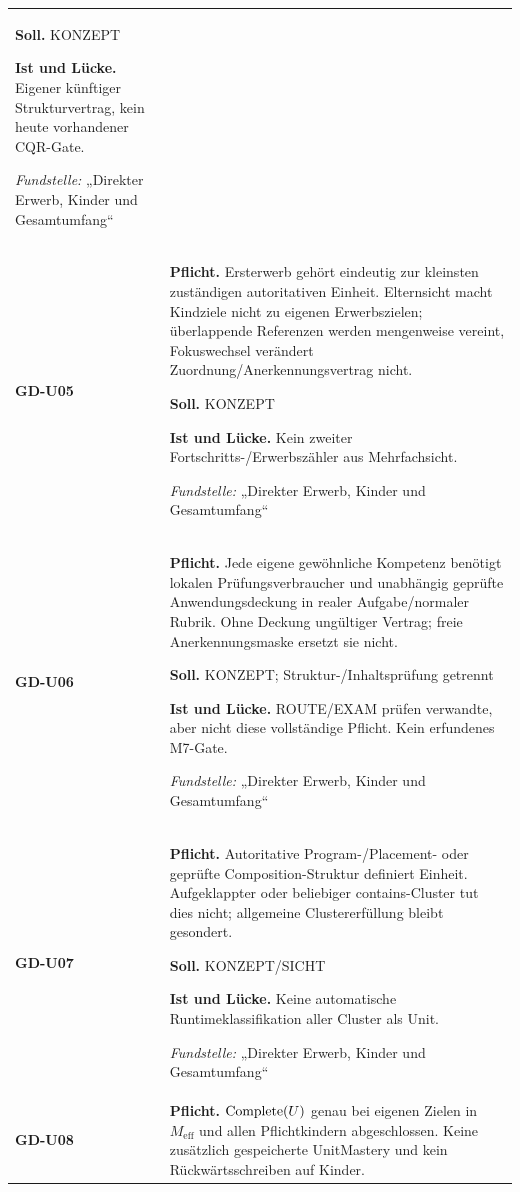 \begin{longtable}{@{}P{20mm}P{128mm}@{}}
\textbf{Soll.} KONZEPT\par\smallskip
\textbf{Ist und Lücke.} Eigener künftiger Strukturvertrag, kein heute vorhandener CQR-Gate.\par\smallskip
\emph{Fundstelle:} „Direkter Erwerb, Kinder und Gesamtumfang“\\\addlinespace[5pt]
\label{rule:GD-U05}\textbf{GD-U05} &
\textbf{Pflicht.} Ersterwerb gehört eindeutig zur kleinsten zuständigen autoritativen Einheit. Elternsicht macht Kindziele nicht zu eigenen Erwerbszielen; überlappende Referenzen werden mengenweise vereint, Fokuswechsel verändert Zuordnung/Anerkennungsvertrag nicht.\par\smallskip
\textbf{Soll.} KONZEPT\par\smallskip
\textbf{Ist und Lücke.} Kein zweiter Fortschritts-/Erwerbszähler aus Mehrfachsicht.\par\smallskip
\emph{Fundstelle:} „Direkter Erwerb, Kinder und Gesamtumfang“\\\addlinespace[5pt]
\label{rule:GD-U06}\textbf{GD-U06} &
\textbf{Pflicht.} Jede eigene gewöhnliche Kompetenz benötigt lokalen Prüfungsverbraucher und unabhängig geprüfte Anwendungsdeckung in realer Aufgabe/normaler Rubrik. Ohne Deckung ungültiger Vertrag; freie Anerkennungsmaske ersetzt sie nicht.\par\smallskip
\textbf{Soll.} KONZEPT; Struktur-/Inhaltsprüfung getrennt\par\smallskip
\textbf{Ist und Lücke.} ROUTE/EXAM prüfen verwandte, aber nicht diese vollständige Pflicht. Kein erfundenes M7-Gate.\par\smallskip
\emph{Fundstelle:} „Direkter Erwerb, Kinder und Gesamtumfang“\\\addlinespace[5pt]
\label{rule:GD-U07}\textbf{GD-U07} &
\textbf{Pflicht.} Autoritative Program-/Placement- oder geprüfte Composition-Struktur definiert Einheit. Aufgeklappter oder beliebiger contains-Cluster tut dies nicht; allgemeine Clustererfüllung bleibt gesondert.\par\smallskip
\textbf{Soll.} KONZEPT/SICHT\par\smallskip
\textbf{Ist und Lücke.} Keine automatische Runtimeklassifikation aller Cluster als Unit.\par\smallskip
\emph{Fundstelle:} „Direkter Erwerb, Kinder und Gesamtumfang“\\\addlinespace[5pt]
\label{rule:GD-U08}\textbf{GD-U08} &
\textbf{Pflicht.} \(\operatorname{Complete}(U)\) genau bei eigenen Zielen in \(M_{\mathrm{eff}}\) und allen Pflichtkindern abgeschlossen. Keine zusätzlich gespeicherte UnitMastery und kein Rückwärtsschreiben auf Kinder.\par\smallskip

\end{longtable}
